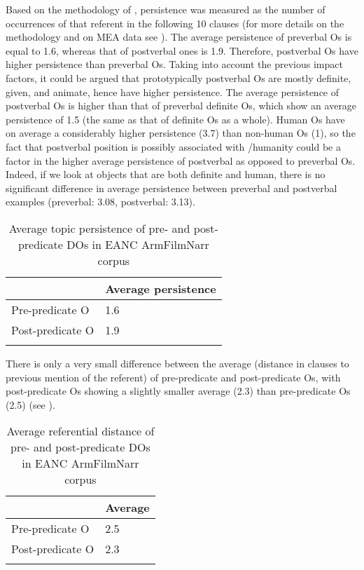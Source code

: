 \documentclass[output=paper,colorlinks,citecolor=brown,draftmode]{langscibook}
\begin{document}
 Based on the methodology of \citet{givon_topic_1983},  persistence was measured as the number of occurrences of that referent in the following 10 clauses (for more details on the methodology and on MEA data see \citealt{hodgson_word_nodate}). The average  persistence of preverbal Os is equal to 1.6, whereas that of postverbal ones is 1.9. Therefore, postverbal Os have higher  persistence than preverbal Os. Taking into account the previous impact factors, it could be argued that prototypically postverbal Os are mostly definite, given, and animate, hence have higher  persistence. The average  persistence of postverbal Os is higher than that of preverbal definite Os, which show an average  persistence of 1.5 (the same as that of definite Os as a whole). Human Os have on average a considerably higher  persistence (3.7) than non-human Os (1), so the fact that postverbal position is possibly associated with /humanity could be a factor in the higher average  persistence of postverbal as opposed to preverbal Os. Indeed, if we look at objects that are both definite and human, there is no significant difference in average  persistence between preverbal and postverbal examples (preverbal: 3.08, postverbal: 3.13).

\begin{table}
    \begin{tabularx}{.8\textwidth}{lY}
\lsptoprule
 & Average  persistence \\
\midrule
Pre-predicate O & 1.6 \\
Post-predicate O & 1.9 \\
\lspbottomrule
    \end{tabularx}
    \caption{Average topic persistence of pre- and post-predicate DOs in EANC ArmFilmNarr corpus}
    \label{Armenian:tab:7}
\end{table}

 There is only a very small difference between the average  (distance in clauses to previous mention of the referent) of pre-predicate and post-predicate Os, with post-predicate Os showing a slightly smaller average  (2.3) than pre-predicate Os (2.5) (see ).

\begin{table}
    \begin{tabularx}{.8\textwidth}{lY}
\lsptoprule
 & Average  \\
\midrule
Pre-predicate O & 2.5 \\
Post-predicate O & 2.3 \\
\lspbottomrule
    \end{tabularx}
    \caption{Average referential distance of pre- and post-predicate DOs in EANC ArmFilmNarr corpus}
    \label{Armenian:tab:8}
\end{table}
\end{document}
